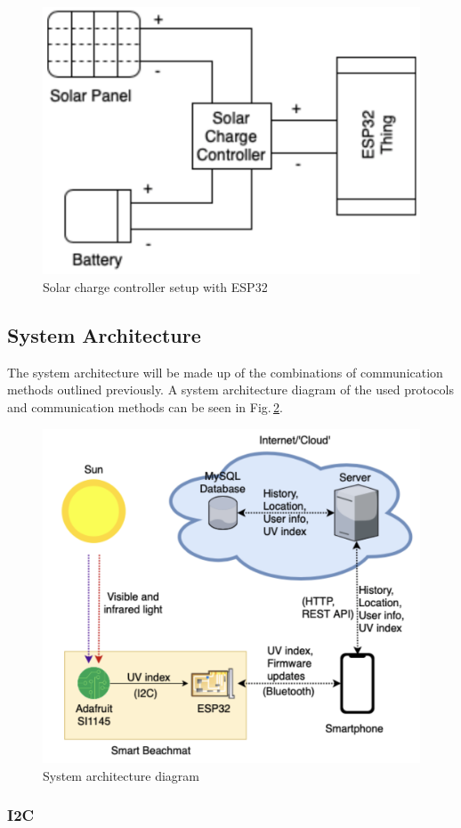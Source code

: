 \documentclass[12pt,openany,a4paper]{book}
\newcommand{\fig}[1]  {Fig.\,\ref{#1}}		%
\begin{document}
\begin{figure}[h]
\centerline{\includegraphics[width=.5\textwidth]{SolarChargeController.png}}
\caption{Solar charge controller setup with ESP32}
\label{fig:solar_charge_controller}
\end{figure}

\subsection{System Architecture}

The system architecture will be made up of the combinations of communication
methods outlined previously. A system architecture diagram of the used protocols
and communication methods can be seen in \fig{fig:system_architecture}.

\begin{figure}[h]
\centerline{\includegraphics[width=.8\textwidth]{SystemArchitecture.png}}
\caption{System architecture diagram}
\label{fig:system_architecture}
\end{figure}

\subsubsection{I2C}
\end{document}
